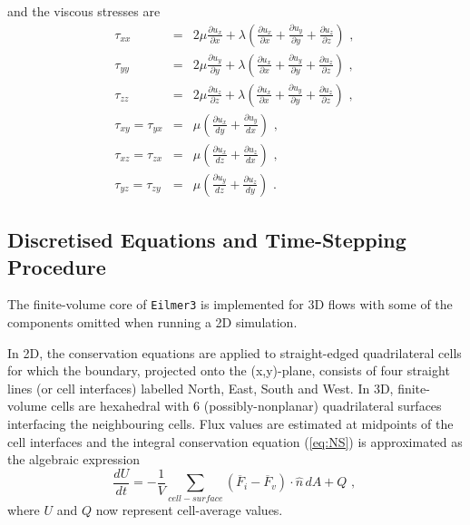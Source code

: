 and the viscous stresses are
\begin{eqnarray}
 \tau_{xx} &=& 2 \mu \frac{\partial u_{x} }{\partial x} 
               + \lambda \left ( \frac{\partial u_{x}}{\partial x} 
                                 + \frac{\partial u_{y}}{\partial y} 
                                 + \frac{\partial u_{z}}{\partial z} \right ) \text{ , } \nonumber \\
 \tau_{yy} &=& 2 \mu \frac{\partial u_{y} }{\partial y} 
               + \lambda \left ( \frac{\partial u_{x}}{\partial x} 
                                 + \frac{\partial u_{y}}{\partial y} 
                                 + \frac{\partial u_{z}}{\partial z} \right ) \text{ , } \nonumber \\
 \tau_{zz} &=& 2 \mu \frac{\partial u_{z} }{\partial z} 
               + \lambda \left ( \frac{\partial u_{x}}{\partial x} 
                                 + \frac{\partial u_{y}}{\partial y} 
                                 + \frac{\partial u_{z}}{\partial z} \right ) \text{ , } \nonumber \\
 \tau_{xy} = \tau_{yx} &=& \mu \left ( \frac{\partial u_{x}}{dy} 
                                     + \frac{\partial u_{y}}{dx} \right ) \text{ , } \nonumber \\
 \tau_{xz} = \tau_{zx} &=& \mu \left ( \frac{\partial u_{x}}{dz} 
                                     + \frac{\partial u_{z}}{dx} \right ) \text{ , } \nonumber \\
 \tau_{yz} = \tau_{zy} &=& \mu \left ( \frac{\partial u_{y}}{dz} 
                                     + \frac{\partial u_{z}}{dy} \right ) \text{ . }
 \label{eq:taus_3D}
\end{eqnarray}



\subsection{Discretised Equations and Time-Stepping Procedure}
\label{sec:mbcns2-update-procedure}
%
The finite-volume core of \texttt{Eilmer3} is implemented for 3D flows with some of the components
omitted when running a 2D simulation.

\medskip
In 2D, the conservation equations are applied to straight-edged quadrilateral cells for which the boundary, 
projected onto the (x,y)-plane, consists of four straight lines (or cell interfaces) labelled North, East, South and West.
In 3D, finite-volume cells are hexahedral with 6 (possibly-nonplanar) quadrilateral surfaces interfacing the
neighbouring cells.
Flux values are estimated at midpoints of the cell interfaces and  
the integral conservation equation (\ref{eq:NS}) is approximated as the algebraic expression
\begin{equation}
 \frac{dU}{dt} = - \frac{1}{V} \sum_{cell-surface} \left ( \overline{F}_{i} - \overline{F}_{v} \right ) \cdot \hat{n} \, dA + Q \text{ , }
 \label{eq:dUdt}
\end{equation}
where $U$ and $Q$ now represent cell-average values. 

